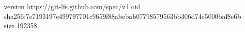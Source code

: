 version https://git-lfs.github.com/spec/v1
oid sha256:7e7193197e499797701c9659f88abebab07798579563bb306d74e5000baf8e6b
size 192358
